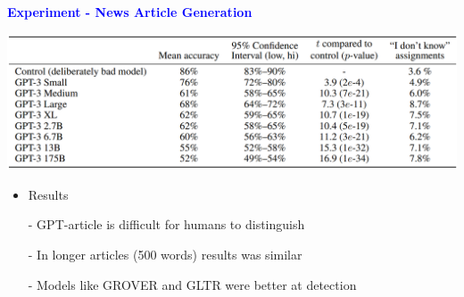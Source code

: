 \documentclass[professionalfont]{beamer}
\begin{document}
\begin{frame}

\begin{center}
    { \textbf{\textcolor{blue}{ {\fontsize{12}{14}\selectfont Experiment - News Article Generation} }} }
\end{center}

\begin{center}
    \includegraphics[width=1.0\textwidth]{table/3-11.png}
\end{center}

{\fontsize{10}{14}\selectfont 
\begin{itemize}
    \item Results

    - GPT-article is difficult for humans to distinguish

    - In longer articles (500 words) results was similar

    - Models like GROVER and GLTR were better at detection

\end{itemize}
}

\end{frame}
\end{document}
